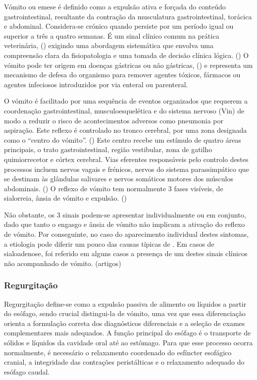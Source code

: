 Vómito ou emese é definido como a expulsão ativa e forçada do conteúdo gastrointestinal, resultante da contração da musculatura gastrointestinal, torácica e abdominal. \cite{Das_Textbook}Considera-se crónico quando persiste por um período igual ou superior a três a quatro semanas. \cite{bsava_2020_gastro} É um sinal clínico comum na prática veterinária, (\cite{Dixit2022}) exigindo uma abordagem sistemática que envolva uma compreensão clara da fisiopatologia e uma tomada de decisão clínica lógica. (\cite{Elwood2010}) O vómito pode ter origem em doenças gástricas ou não gástricas, (\cite{McGrotty2010}) e representa um mecanismo de defesa do organismo para remover agentes tóxicos, fármacos ou agentes infeciosos introduzidos por via enteral ou parenteral. \cite{Das_Textbook}


O vómito é facilitado por uma sequência de eventos organizados que requerem a coordenação gastrointestinal, musculoesquelética e do sistema nervoso (Vin) de modo a reduzir o risco de acontecimentos adversos como pneumonia por aspiração. Este reflexo é controlado no tronco cerebral, por uma zona designada como o “centro do vómito”. (\cite{Elwood2010}) Este centro recebe um estímulo de quatro áreas principais, o trato gastrointestinal, região vestibular, zona de gatilho quimiorrecetor  e córtex cerebral. \cite{Das_Textbook} Vias eferentes responsáveis pelo controlo destes processos incluem nervos vagais e frénicos, nervos do sistema parassimpático que se destinam às glândulas salivares e nervos somáticos motores dos músculos abdominais. (\cite{Elwood2010}) O reflexo de vómito tem normalmente 3 fases visíveis, de sialorreia, ânsia de vómito e expulsão. (\cite{Elwood2010}) 


Não obstante, os 3 sinais podem-se apresentar individualmente ou em conjunto, dado que tanto o engasgo e ânsia de vómito não implicam a ativação do reflexo de vómito. Por conseguinte, no caso do aparecimento individual destes sintomas, a etiologia pode diferir um pouco das causas típicas de \cite{Elwood2010,Das_Textbook}.  Em casos de sialoadenose, foi referido em alguns casos a presença de um destes sinais clínicos não acompanhado de vómito. (artigos)


\subsubsection{Regurgitação}

Regurgitação define-se como a expulsão passiva de alimento ou líquidos a partir do esófago, \cite{bsava_2020_gastro,_canine_gastro_2013} sendo crucial distingui-la de vómito, \cite{_canine_gastro_2013} uma vez que essa diferenciação orienta a formulação correta dos diagnósticos diferenciais e a seleção de exames complementares mais adequados. \cite{bsava_2020_gastro}
A função principal do esófago é o transporte de sólidos e líquidos da cavidade oral até ao estômago. \cite{_canine_gastro_2013} Para que esse processo ocorra normalmente, é necessário o relaxamento coordenado do esfíncter esofágico cranial, a integridade das contrações peristálticas e o relaxamento adequado do esófago caudal. \cite{_canine_gastro_2013}


